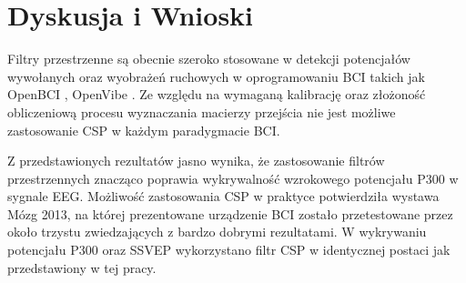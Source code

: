 \documentclass[licencjacka,openright]{pracamgr}
\begin{document}
\chapter{Dyskusja i Wnioski}
Filtry przestrzenne są obecnie szeroko stosowane w detekcji potencjałów wywołanych oraz wyobrażeń ruchowych w oprogramowaniu BCI takich jak OpenBCI \citep{obci_conf}, OpenVibe \citep{renard2010}. Ze względu na wymaganą kalibrację oraz złożoność obliczeniową procesu wyznaczania macierzy przejścia nie jest możliwe zastosowanie CSP w każdym paradygmacie BCI.

Z przedstawionych rezultatów jasno wynika, że zastosowanie filtrów przestrzennych znacząco poprawia wykrywalność wzrokowego potencjału P300 w sygnale EEG. Możliwość zastosowania CSP w praktyce potwierdziła wystawa Mózg 2013, na której prezentowane urządzenie BCI zostało przetestowane przez około trzystu zwiedzających z bardzo dobrymi rezultatami. W wykrywaniu potencjału P300 oraz SSVEP wykorzystano filtr CSP w identycznej postaci jak przedstawiony w tej pracy.


\end{document}
